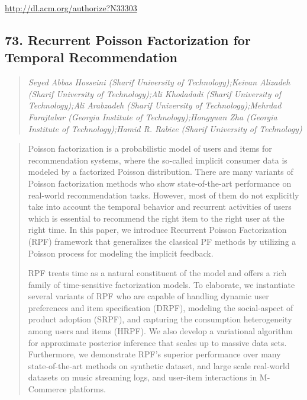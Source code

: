 \documentclass{article}
\begin{document}
\href{http://dl.acm.org/authorize?N33303}{http://dl.acm.org/authorize?N33303}

\subsection{73. Recurrent Poisson Factorization for Temporal Recommendation}

\begin{quote}
\footnotesize{\textit{Seyed Abbas Hosseini (Sharif University of Technology);Keivan Alizadeh (Sharif University of Technology);Ali Khodadadi (Sharif University of Technology);Ali Arabzadeh (Sharif University of Technology);Mehrdad Farajtabar (Georgia Institute of Technology);Hongyuan Zha (Georgia Institute of Technology);Hamid R. Rabiee (Sharif University of Technology)}}

\end{quote}

\begin{quote}
Poisson factorization is a probabilistic model of users and items for recommendation systems, where the so-called implicit consumer data is modeled by a factorized Poisson distribution. There are many variants of Poisson factorization methods who show state-of-the-art performance on real-world recommendation tasks. However, most of them do not explicitly take into account the temporal behavior and recurrent activities of users which is essential to recommend the right item to the right user at the right time. In this paper, we introduce Recurrent Poisson Factorization (RPF) framework that generalizes the classical PF methods by utilizing a Poisson process for modeling the implicit feedback.







  RPF treats time as a natural constituent of the model and offers a rich family of time-sensitive factorization models. To elaborate, we instantiate several variants of RPF who are capable of handling dynamic user preferences and item specification (DRPF), modeling the social-aspect of product adoption (SRPF), and capturing the consumption heterogeneity among users and items (HRPF). We also develop a variational algorithm for approximate posterior inference that scales up to massive data sets. Furthermore, we demonstrate RPF’s superior performance over many state-of-the-art methods on synthetic dataset, and large scale real-world datasets on music streaming logs, and user-item interactions in M-Commerce platforms.
\end{quote}
\end{document}

